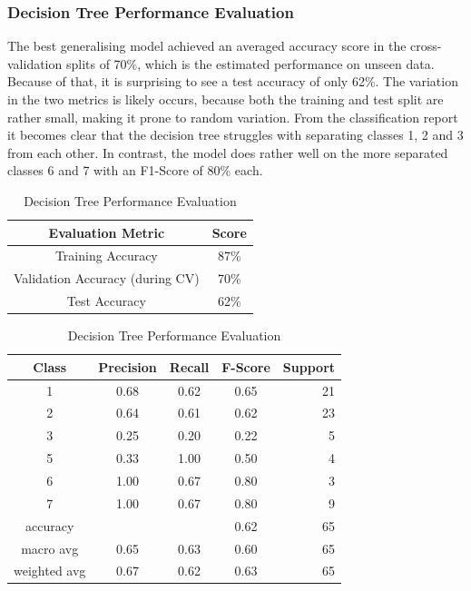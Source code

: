 \subsubsection{Decision Tree Performance Evaluation}
The best generalising model achieved an averaged accuracy score in the cross-validation splits of 70\%, which is the estimated performance on unseen data. Because of that, it is surprising to see a test accuracy of only 62\%. The variation in the two metrics is likely occurs, because both the training and test split are rather small, making it prone to random variation. From the classification report it becomes clear that the decision tree struggles with separating classes 1, 2 and 3 from each other. In contrast, the model does rather well on the more separated classes 6 and 7 with an F1-Score of 80\% each.  
\newline

\begin{table}[!ht]
\begin{subtable}[c]{0.4\textwidth}
\footnotesize
\centering
\begin{tabular}{ c | c }
 \toprule
 Evaluation Metric & Score  \\
 \midrule 
 Training Accuracy & 87\% \\
 Validation Accuracy (during CV) & 70\% \\
 Test Accuracy & 62\% \\
 \bottomrule
\end{tabular}
\captionsetup{justification=centering,margin=1cm}
\end{subtable}
\begin{subtable}[c]{0.6\textwidth}
\footnotesize
\centering
\begin{tabular}{c | c c c r}
Class & Precision & Recall & F-Score & Support\\
\midrule
1   &    0.68  &    0.62  &    0.65  &  21 \\
2   &    0.64  &    0.61  &    0.62  &  23 \\
3   &    0.25  &    0.20  &    0.22  &   5 \\
5   &    0.33  &    1.00  &    0.50  &   4 \\
6   &    1.00  &    0.67  &    0.80  &   3 \\
7   &    1.00  &    0.67  &    0.80  &   9 \\
\midrule
    accuracy   &           &         &    0.62   &   65 \\
   macro avg   &    0.65   &   0.63  &    0.60   &   65 \\
weighted avg   &    0.67   &   0.62  &    0.63   &   65 \\
\end{tabular}
\captionsetup{justification=centering,margin=1cm}
\end{subtable}
\caption{Decision Tree Performance Evaluation}
\label{dt_evaluation}
\end{table}


